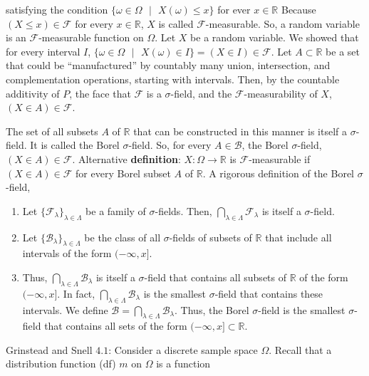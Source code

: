 \documentclass[12pt]{article}
\newcommand{\R}{\mathbb{R}}
\newcommand{\field}{\mathcal{F}}
\newcommand{\nspace}{\vspace*{.5cm}}
\newcommand{\nline}{\nspace \noindent}
\begin{document}
\noindent
satisfying the condition $\{ \omega \in \Omega \text{ } \lvert \text{ } X(\omega) \leq x \}$ for ever $x \in \R$ Because $(X \leq x) \in \field$ for every $x \in \R$, $X$ is called $\field$-measurable. So, a random variable is an $\field$-measurable function on $\Omega$. Let $X$ be a random variable. We showed that for every interval $I$, $\{ \omega \in \Omega \text{ } \lvert \text{ } X(\omega) \in I \} = (X \in I) \in \field$. Let $A \subset \R$ be a set that could be ``manufactured'' by countably many union, intersection, and complementation operations, starting with intervals. Then, by the countable additivity of $P$, the face that $\field$ is a $\sigma$-field, and the $\field$-measurability of $X$, $(X \in A) \in \field$.

\nspace
\noindent
The set of all subsets $A$ of $\R$ that can be constructed in this manner is itself a $\sigma$-field. It is called the Borel $\sigma$-field. So, for every $A \in \mathcal{B}$, the Borel $\sigma$-field, $(X \in A) \in \field$. Alternative \textbf{definition}: $X: \Omega \rightarrow \R$ is $\field$-measurable if $(X \in A) \in \field$ for every Borel subset $A$ of $\R$. A rigorous definition of the Borel $\sigma$-field,

\begin{enumerate}[label=(\roman*)]
\item Let $\big \{ \field_{\lambda} \big \}_{\lambda \in \Lambda}$ be a family of $\sigma$-fields. Then, $\bigcap_{\lambda \in \Lambda} \field_{\lambda}$ is itself a $\sigma$-field.
\item Let $\big \{ \mathcal{B}_{\lambda} \big \}_{\lambda \in \Lambda}$ be the class of all $\sigma$-fields of subsets of $\R$ that include all intervals of the form $(- \infty, x ]$.
\item Thus, $\bigcap_{\lambda \in \Lambda} \mathcal{B}_{\lambda}$ is itself a $\sigma$-field that contains all subsets of $\R$ of the form $(- \infty, x ]$. In fact, $\bigcap_{\lambda \in \Lambda} \mathcal{B}_{\lambda}$ is the smallest $\sigma$-field that contains these intervals. We define $\mathcal{B} = \bigcap_{\lambda \in \Lambda} \mathcal{B}_{\lambda}$. Thus, the Borel $\sigma$-field is the smallest $\sigma$-field that contains all sets of the form $( - \infty, x] \subset \R$.
\end{enumerate}

\nline
Grinstead and Snell $4.1$: Consider a discrete sample space $\Omega$. Recall that a distribution function (df) $m$ on $\Omega$ is a function
\end{document}
